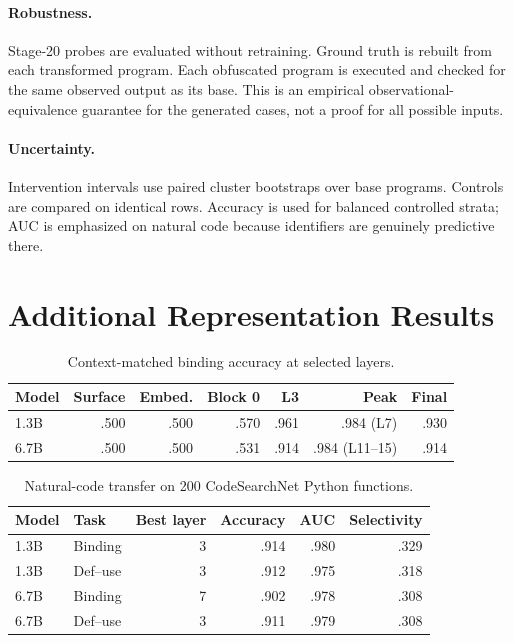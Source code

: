 \documentclass{article}
\begin{document}
\paragraph{Robustness.}
Stage-20 probes are evaluated without retraining. Ground truth is rebuilt from each transformed program. Each obfuscated program is executed and checked for the same observed output as its base. This is an empirical observational-equivalence guarantee for the generated cases, not a proof for all possible inputs.

\paragraph{Uncertainty.}
Intervention intervals use paired cluster bootstraps over base programs. Controls are compared on identical rows. Accuracy is used for balanced controlled strata; AUC is emphasized on natural code because identifiers are genuinely predictive there.

\section{Additional Representation Results}

\begin{table}[h]
\centering
\small
\caption{Context-matched binding accuracy at selected layers.}
\begin{tabular}{lrrrrrr}
\toprule
Model & Surface & Embed. & Block 0 & L3 & Peak & Final \\
\midrule
1.3B & .500 & .500 & .570 & .961 & .984 (L7) & .930 \\
6.7B & .500 & .500 & .531 & .914 & .984 (L11--15) & .914 \\
\bottomrule
\end{tabular}
\end{table}

\begin{table}[h]
\centering
\small
\caption{Natural-code transfer on 200 CodeSearchNet Python functions.}
\begin{tabular}{llrrrr}
\toprule
Model & Task & Best layer & Accuracy & AUC & Selectivity \\
\midrule
1.3B & Binding & 3 & .914 & .980 & .329 \\
1.3B & Def--use & 3 & .912 & .975 & .318 \\
6.7B & Binding & 7 & .902 & .978 & .308 \\
6.7B & Def--use & 3 & .911 & .979 & .308 \\
\bottomrule
\end{tabular}
\end{table}
\end{document}
